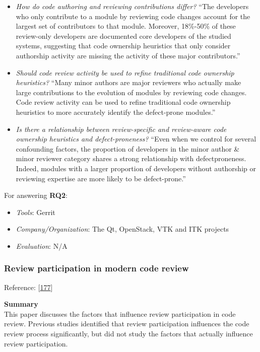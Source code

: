\documentclass[]{book}
\providecommand{\tightlist}{%
  \setlength{\itemsep}{0pt}\setlength{\parskip}{0pt}}
\begin{document}
\begin{itemize}
\item
  \emph{How do code authoring and reviewing contributions differ?} ``The
  developers who only contribute to a module by reviewing code changes
  account for the largest set of contributors to that module. Moreover,
  18\%-50\% of these review-only developers are documented core
  developers of the studied systems, suggesting that code ownership
  heuristics that only consider authorship activity are missing the
  activity of these major contributors.''
\item
  \emph{Should code review activity be used to refine traditional code
  ownership heuristics?} ``Many minor authors are major reviewers who
  actually make large contributions to the evolution of modules by
  reviewing code changes. Code review activity can be used to refine
  traditional code ownership heuristics to more accurately identify the
  defect-prone modules.''
\item
  \emph{Is there a relationship between review-specific and review-aware
  code ownership heuristics and defect-proneness?} ``Even when we
  control for several confounding factors, the proportion of developers
  in the minor author \& minor reviewer category shares a strong
  relationship with defectproneness. Indeed, modules with a larger
  proportion of developers without authorship or reviewing expertise are
  more likely to be defect-prone.''
\end{itemize}

For answering \textbf{RQ2}:

\begin{itemize}
\tightlist
\item
  \emph{Tools}: Gerrit
\item
  \emph{Company/Organization}: The Qt, OpenStack, VTK and ITK projects
\item
  \emph{Evaluation}: N/A
\end{itemize}

\subsubsection{Review participation in modern code
review}\label{review-participation-in-modern-code-review}

Reference: {[}\protect\hyperlink{ref-thongtanunam2017review}{177}{]}

\textbf{Summary}\\
This paper discusses the factors that influence review participation in
code review. Previous studies identified that review participation
influences the code review process significantly, but did not study the
factors that actually influence review participation.
\end{document}
